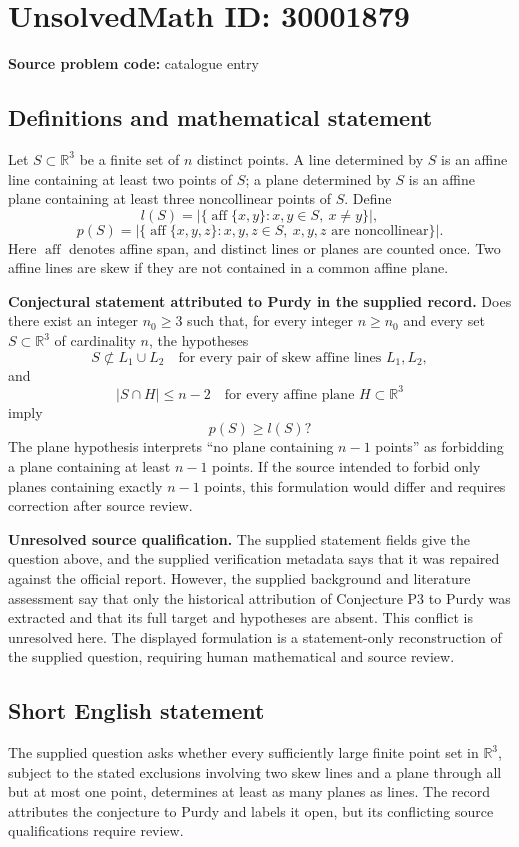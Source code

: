 \documentclass[11pt]{article}
\newcommand{\R}{\mathbb{R}}
\begin{document}
\section*{UnsolvedMath ID: 30001879}
\textbf{Source problem code:} catalogue entry
\subsection{Definitions and mathematical statement}
Let \(S\subset\R^3\) be a finite set of \(n\) distinct points. A line determined by \(S\) is an affine line containing at least two points of \(S\); a plane determined by \(S\) is an affine plane containing at least three noncollinear points of \(S\). Define
\[
 l(S)=\left|\{\operatorname{aff}\{x,y\}:x,y\in S,\ x\ne y\}\right|,
\]
\[
 p(S)=\left|\{\operatorname{aff}\{x,y,z\}:x,y,z\in S,\ x,y,z\text{ are noncollinear}\}\right|.
\]
Here \(\operatorname{aff}\) denotes affine span, and distinct lines or planes are counted once. Two affine lines are skew if they are not contained in a common affine plane.

\textbf{Conjectural statement attributed to Purdy in the supplied record.} Does there exist an integer \(n_0\ge 3\) such that, for every integer \(n\ge n_0\) and every set \(S\subset\R^3\) of cardinality \(n\), the hypotheses
\[
 S\not\subset L_1\cup L_2\quad\text{for every pair of skew affine lines }L_1,L_2,
\]
and
\[
 |S\cap H|\le n-2\quad\text{for every affine plane }H\subset\R^3
\]
imply
\[
 p(S)\ge l(S)?
\]
The plane hypothesis interprets ``no plane containing \(n-1\) points'' as forbidding a plane containing at least \(n-1\) points. If the source intended to forbid only planes containing exactly \(n-1\) points, this formulation would differ and requires correction after source review.

\textbf{Unresolved source qualification.} The supplied statement fields give the question above, and the supplied verification metadata says that it was repaired against the official report. However, the supplied background and literature assessment say that only the historical attribution of Conjecture P3 to Purdy was extracted and that its full target and hypotheses are absent. This conflict is unresolved here. The displayed formulation is a statement-only reconstruction of the supplied question, requiring human mathematical and source review.
\subsection{Short English statement}
The supplied question asks whether every sufficiently large finite point set in \(\R^3\), subject to the stated exclusions involving two skew lines and a plane through all but at most one point, determines at least as many planes as lines. The record attributes the conjecture to Purdy and labels it open, but its conflicting source qualifications require review.
\end{document}
